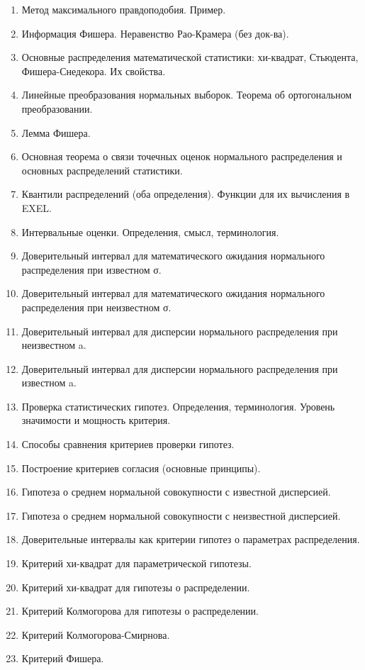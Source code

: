 \begin{enumerate}
    \item Метод максимального правдоподобия. Пример.
    \item Информация Фишера. Неравенство Рао-Крамера (без док-ва).
    \item Основные распределения математической статистики: хи-квадрат, Стьюдента, Фишера-Снедекора. Их свойства.
    \item Линейные преобразования нормальных выборок. Теорема об ортогональном преобразовании.
    \item Лемма Фишера.
    \item Основная теорема о связи точечных оценок нормального распределения и основных распределений статистики.
    \item Квантили распределений (оба определения). Функции для их вычисления в EXEL.
    \item Интервальные оценки. Определения, смысл, терминология.
    \item Доверительный интервал для математического ожидания нормального распределения при известном σ.
    \item Доверительный интервал для математического ожидания нормального распределения при неизвестном σ.
    \item Доверительный интервал для дисперсии нормального распределения при неизвестном a.
    \item Доверительный интервал для дисперсии нормального распределения при известном a.
    \item Проверка статистических гипотез. Определения, терминология. Уровень значимости и мощность критерия.
    \item Способы сравнения критериев проверки гипотез.
    \item Построение критериев согласия (основные принципы).
    \item Гипотеза о среднем нормальной совокупности с известной дисперсией.
    \item Гипотеза о среднем нормальной совокупности с неизвестной дисперсией.
    \item Доверительные интервалы как критерии гипотез о параметрах распределения.
    \item Критерий хи-квадрат для параметрической гипотезы.
    \item Критерий хи-квадрат для гипотезы о распределении.
    \item Критерий Колмогорова для гипотезы о распределении.
    \item Критерий Колмогорова-Смирнова.
    \item Критерий Фишера.

\end{enumerate}
